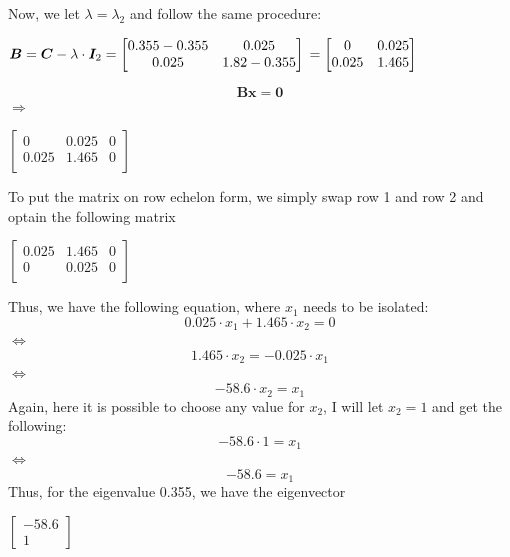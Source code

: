 \documentclass{report}
\begin{document}
Now, we let $\lambda = \lambda_2$ and follow the same procedure:
\begin{center}
    \begin{math}
        \bm{B} = \bm{C} - \lambda \cdot \bm{I}_2 =
        \begin{bmatrix}
            0.355 - 0.355 & 0.025 \\
            0.025 & 1.82 - 0.355
        \end{bmatrix}
        \newline =
        \begin{bmatrix}
            0 & 0.025 \\
            0.025 & 1.465 \\
        \end{bmatrix}
    \end{math}
\end{center}
$$\bm{B} \bm{x} = \bm{0}$$
$\Rightarrow$
\begin{center}
    \begin{math}
        \left[
        \begin{array}{cc|c}
            0 & 0.025 & 0 \\
            0.025 & 1.465 & 0 \\
        \end{array}
        \right]
    \end{math}
\end{center}
To put the matrix on row echelon form, we simply swap row 1 and row 2 and optain the following matrix
\begin{center}
    \begin{math}
        \left[
        \begin{array}{cc|c}
            0.025 & 1.465 & 0 \\
            0 & 0.025 & 0 \\
        \end{array}
        \right]
    \end{math}
\end{center}
Thus, we have the following equation, where $x_1$ needs to be isolated:
$$0.025 \cdot x_1 + 1.465 \cdot x_2 = 0$$
$\Leftrightarrow$
$$1.465 \cdot x_2 = -0.025 \cdot x_1$$
$\Leftrightarrow$
$$ -58.6 \cdot x_2 = x_1$$
Again, here it is possible to choose any value for $x_2$, I will let $x_2 = 1$ and get the following:
$$ -58.6 \cdot 1 = x_1$$
$\Leftrightarrow$
$$ -58.6 = x_1$$
Thus, for the eigenvalue 0.355, we have the eigenvector
\begin{center}
    \begin{math}
        \left[
            \begin{array}{c}
                -58.6 \\
                1
            \end{array}
        \right]
    \end{math}
\end{center}
\end{document}
